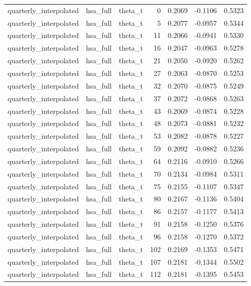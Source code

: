\begin{tabular}{lllrrrr}
quarterly\_interpolated & hsa\_full & theta\_t & 0 & 0.2069 & -0.1106 & 0.5323 \\
quarterly\_interpolated & hsa\_full & theta\_t & 5 & 0.2077 & -0.0957 & 0.5344 \\
quarterly\_interpolated & hsa\_full & theta\_t & 11 & 0.2066 & -0.0941 & 0.5330 \\
quarterly\_interpolated & hsa\_full & theta\_t & 16 & 0.2047 & -0.0963 & 0.5278 \\
quarterly\_interpolated & hsa\_full & theta\_t & 21 & 0.2050 & -0.0920 & 0.5262 \\
quarterly\_interpolated & hsa\_full & theta\_t & 27 & 0.2063 & -0.0870 & 0.5253 \\
quarterly\_interpolated & hsa\_full & theta\_t & 32 & 0.2070 & -0.0875 & 0.5249 \\
quarterly\_interpolated & hsa\_full & theta\_t & 37 & 0.2072 & -0.0868 & 0.5263 \\
quarterly\_interpolated & hsa\_full & theta\_t & 43 & 0.2069 & -0.0874 & 0.5228 \\
quarterly\_interpolated & hsa\_full & theta\_t & 48 & 0.2073 & -0.0881 & 0.5232 \\
quarterly\_interpolated & hsa\_full & theta\_t & 53 & 0.2082 & -0.0878 & 0.5227 \\
quarterly\_interpolated & hsa\_full & theta\_t & 59 & 0.2092 & -0.0882 & 0.5236 \\
quarterly\_interpolated & hsa\_full & theta\_t & 64 & 0.2116 & -0.0910 & 0.5266 \\
quarterly\_interpolated & hsa\_full & theta\_t & 70 & 0.2134 & -0.0984 & 0.5311 \\
quarterly\_interpolated & hsa\_full & theta\_t & 75 & 0.2155 & -0.1107 & 0.5347 \\
quarterly\_interpolated & hsa\_full & theta\_t & 80 & 0.2167 & -0.1136 & 0.5404 \\
quarterly\_interpolated & hsa\_full & theta\_t & 86 & 0.2157 & -0.1177 & 0.5413 \\
quarterly\_interpolated & hsa\_full & theta\_t & 91 & 0.2158 & -0.1250 & 0.5376 \\
quarterly\_interpolated & hsa\_full & theta\_t & 96 & 0.2158 & -0.1270 & 0.5372 \\
quarterly\_interpolated & hsa\_full & theta\_t & 102 & 0.2169 & -0.1353 & 0.5471 \\
quarterly\_interpolated & hsa\_full & theta\_t & 107 & 0.2181 & -0.1344 & 0.5502 \\
quarterly\_interpolated & hsa\_full & theta\_t & 112 & 0.2181 & -0.1395 & 0.5453 \\

\end{tabular}
